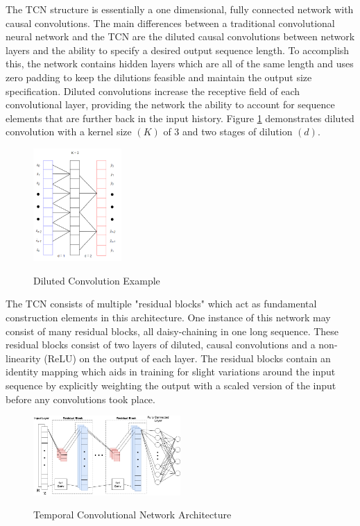 \documentclass[twocolumn,letterpaper]{IEEEAerospaceCLS}  %
\begin{document}
The TCN structure is essentially a one dimensional, fully connected network with causal convolutions. The main differences between a traditional convolutional neural network and the TCN are the diluted causal convolutions between network layers and the ability to specify a desired output sequence length. To accomplish this, the network contains hidden layers which are all of the same length and uses zero padding to keep the dilutions feasible and maintain the output size specification. Diluted convolutions increase the receptive field of each convolutional layer, providing the network the ability to account for sequence elements that are further back in the input history. Figure \ref{dilutedconv} demonstrates diluted convolution with a kernel size $(K)$ of 3 and two stages of dilution $(d)$.

\begin{figure}[!h]
	\centering\includegraphics[width=0.3\textwidth]{figs/dilutedconv.PNG}\\
	\caption{Diluted Convolution Example}
	\label{dilutedconv}
\end{figure}

The TCN consists of multiple "residual blocks" which act as fundamental construction elements in this architecture. One instance of this network may consist of many residual blocks, all daisy-chaining in one long sequence. These residual blocks consist of two layers of diluted, causal convolutions and a non-linearity (ReLU) on the output of each layer. The residual blocks contain an identity mapping which aids in training for slight variations around the input sequence by explicitly weighting the output with a scaled version of the input before any convolutions took place. 

\begin{figure}[!h]
	\centering\includegraphics[width=0.5\textwidth]{figs/TCN.png}\\
	\caption{Temporal Convolutional Network Architecture}
	\label{TCNstruct}
\end{figure}
\end{document}
